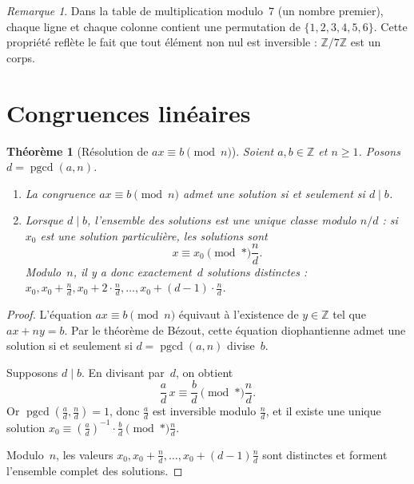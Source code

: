 \documentclass[12pt,a4paper,openany]{book}
\theoremstyle{definition}
\theoremstyle{plain}
\newtheorem{theoreme}[definition]{Théorème}
\theoremstyle{remark}
\newtheorem{remarque}[definition]{Remarque}
\newcommand{\Z}{\mathbb{Z}}
\DeclareMathOperator{\pgcd}{pgcd}
\begin{document}
\begin{remarque}
Dans la table de multiplication modulo~$7$ (un nombre premier), chaque ligne et
chaque colonne contient une permutation de $\{1, 2, 3, 4, 5, 6\}$. Cette propriété
reflète le fait que tout élément non nul est inversible : $\Z/7\Z$ est un corps.
\end{remarque}

\section{Congruences linéaires}
\label{sec:cong-lin}

\begin{theoreme}[Résolution de $ax \equiv b \pmod{n}$]
\label{thm:cong-lin}
Soient $a, b \in \Z$ et $n \geqslant 1$. Posons $d = \pgcd(a, n)$.
\begin{enumerate}[label=(\roman*)]
  \item La congruence $ax \equiv b \pmod{n}$ admet une solution si et seulement si
    $d \mid b$.
  \item Lorsque $d \mid b$, l'ensemble des solutions est une unique classe modulo
    $n/d$ : si $x_0$ est une solution particulière, les solutions sont
    \[
      x \equiv x_0 \pmod*{\frac{n}{d}}.
    \]
    Modulo~$n$, il y a donc exactement~$d$ solutions distinctes :
    $x_0, x_0 + \frac{n}{d}, x_0 + 2\cdot\frac{n}{d}, \ldots,
    x_0 + (d-1)\cdot\frac{n}{d}$.
\end{enumerate}
\end{theoreme}

\begin{proof}
L'équation $ax \equiv b \pmod{n}$ équivaut à l'existence de $y \in \Z$ tel que
$ax + ny = b$. Par le théorème de Bézout, cette équation diophantienne admet une
solution si et seulement si $d = \pgcd(a, n)$ divise~$b$.

Supposons $d \mid b$. En divisant par~$d$, on obtient
\[
  \frac{a}{d}\, x \equiv \frac{b}{d} \pmod*{\frac{n}{d}}.
\]
Or $\pgcd\!\left(\frac{a}{d}, \frac{n}{d}\right) = 1$, donc $\frac{a}{d}$ est
inversible modulo $\frac{n}{d}$, et il existe une unique solution
$x_0 \equiv \left(\frac{a}{d}\right)^{-1} \cdot \frac{b}{d} \pmod*{\frac{n}{d}}$.

Modulo~$n$, les valeurs $x_0, x_0 + \frac{n}{d}, \ldots,
x_0 + (d-1)\frac{n}{d}$ sont distinctes et forment l'ensemble complet des solutions.
\end{proof}
\end{document}
